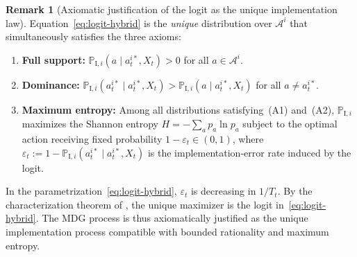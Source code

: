 \documentclass[12pt]{article}
\numberwithin{equation}{section}
\numberwithin{table}{section}
\theoremstyle{definition}
\newtheorem{remark}[theorem]{Remark}
\newcommand{\ProbI}[1]{\mathbb{P}_{\mathrm{I},#1}}
\begin{document}
\begin{remark}[Axiomatic justification of the logit as the unique implementation law]
\label{rem:axiomas-logit}
Equation~\eqref{eq:logit-hybrid} is the \emph{unique} distribution over
$\mathcal{A}^i$ that simultaneously satisfies the three axioms:
\begin{enumerate}
  \item[\textup{(A1)}] \textbf{Full support:}
  $\ProbI{i}(a\mid a_t^{i\ast},X_t)>0$ for all $a\in\mathcal{A}^i$.
  \item[\textup{(A2)}] \textbf{Dominance:}
  $\ProbI{i}(a_t^{i\ast}\mid a_t^{i\ast},X_t)>\ProbI{i}(a\mid a_t^{i\ast},X_t)$
  for all $a\neq a_t^{i\ast}$.
  \item[\textup{(A3)}] \textbf{Maximum entropy:}
  Among all distributions satisfying~(A1) and~(A2),
  $\ProbI{i}$ maximizes the Shannon entropy
  $H=-\sum_a p_a\ln p_a$ subject to the optimal action receiving fixed
  probability $1-\varepsilon_t\in(0,1)$, where
  $\varepsilon_t:=1-\ProbI{i}(a_t^{i\ast}\mid a_t^{i\ast},X_t)$ is the
  implementation-error rate induced by the logit.
\end{enumerate}
In the parametrization~\eqref{eq:logit-hybrid}, $\varepsilon_t$ is decreasing
in $1/T_t$. By the characterization theorem of \citet{Jaynes1957Information}, the unique
maximizer is the logit in~\eqref{eq:logit-hybrid}. The MDG process is thus
axiomatically justified as the unique implementation process compatible with
bounded rationality and maximum entropy.
\end{remark}

\bigskip
\end{document}
